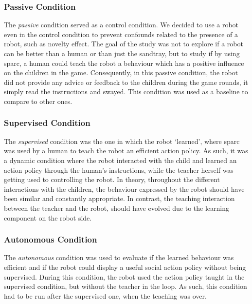 \subsubsection{Passive Condition}

The \textit{passive} condition served as a control condition. We decided to use a robot even in the control condition to prevent confounds related to the presence of a robot, such as novelty effect. The goal of the study was not to explore if a robot can be better than a human or than just the sandtray, but to study if by using \gls{sparc}, a human could teach the robot a behaviour which has a positive influence on the children in the game. Consequently, in this passive condition, the robot did not provide any advice or feedback to the children during the game rounds, it simply read the instructions and swayed. This condition was used as a baseline to compare to other ones.




\subsubsection{Supervised Condition}

The \textit{supervised} condition was the one in which the robot `learned', where \gls{sparc} was used by a human to teach the robot an efficient action policy. As such, it was a dynamic condition where the robot interacted with the child and learned an action policy through the human's instructions, while the teacher herself was getting used to controlling the robot. In theory, throughout the different interactions with the children, the behaviour expressed by the robot should have been similar and constantly appropriate. In contrast, the teaching interaction between the teacher and the robot, should have evolved due to the learning component on the robot side. 

\subsubsection{Autonomous Condition}

The \textit{autonomous} condition was used to evaluate if the learned behaviour was efficient and if the robot could display a useful social action policy without being supervised. During this condition, the robot used the action policy taught in the supervised condition, but without the teacher in the loop. As such, this condition had to be run after the supervised one, when the teaching was over. %

